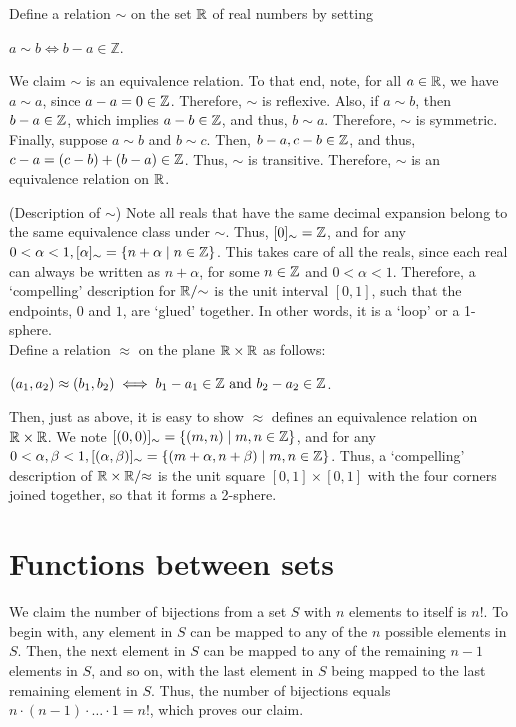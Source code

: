 \begin{xca}
Define a relation $\sim$ on the set $\mathbb{R}$ of real numbers by setting
\begin{center}
 $a \sim b \iff b - a \in \mathbb{Z}$.
\end{center}
We claim $\sim$ is an equivalence relation. To that end, note, for all $a \in
\mathbb{R}$, we have $a \sim a$, since $a - a = 0 \in \mathbb{Z}$. Therefore, $\sim$ is
reflexive. Also, if $a \sim b$, then $b - a \in \mathbb{Z}$, which implies $a - b \in
\mathbb{Z}$, and thus, $b \sim a$. Therefore, $\sim$ is symmetric. Finally, suppose $a
\sim b$ and $b \sim c$. Then, $b - a, c - b \in \mathbb{Z}$, and thus, $c - a = (c - b)
+ (b - a) \in \mathbb{Z}$. Thus, $\sim$ is transitive. Therefore, $\sim$ is an
equivalence relation on $\mathbb{R}$.

(Description of $\sim$) Note all reals that have the same decimal expansion
belong to the same equivalence class under $\sim$. Thus, $[0]_{\sim} = \mathbb{Z}$, and
for any $0 < \alpha < 1, [\alpha]_{\sim} = \{ n + \alpha \mid n \in \mathbb{Z} \}$. This
takes care of all the reals, since each real can always be written as $n +
\alpha$, for some $n \in \mathbb{Z}$ and $0 < \alpha < 1$. Therefore, a `compelling'
description for $\mathbb{R}/{\sim}$ is the unit interval $[0,1]$, such that the
endpoints, $0$ and $1$, are `glued' together. In other words, it is a `loop'
or a 1-sphere.\\

Define a relation $\approx$ on the plane $\mathbb{R} \times \mathbb{R}$ as follows:
\begin{center}
$(a_1, a_2) \approx (b_1, b_2) \iff b_1 - a_1 \in \mathbb{Z} \text{ and }
b_2 - a_2 \in \mathbb{Z}$.
\end{center}
Then, just as above, it is easy to show $\approx$ defines an equivalence
relation on $\mathbb{R} \times \mathbb{R}$. We note $[(0,0)]_{\sim} = \{ (m,n) \mid m,n \in \mathbb{Z}
\}$, and for any $0 < \alpha, \beta < 1, [(\alpha, \beta)]_{\sim} = \{ (m +
\alpha, n + \beta) \mid m,n \in \mathbb{Z} \}$. Thus, a `compelling' description of $\mathbb{R}
\times \mathbb{R}/{\approx}$ is the unit square $[0,1] \times [0,1]$ with the four
corners joined together, so that it forms a 2-sphere.
\end{xca}

\section{Functions between sets}
\begin{xca}
We claim the number of bijections from a set $S$ with $n$ elements to itself is
$n!$. To begin with, any element in $S$ can be mapped to any of the $n$ possible
elements in $S$. Then, the next element in $S$ can be mapped to any of the
remaining $n-1$ elements in $S$, and so on, with the last element in $S$ being
mapped to the last remaining element in $S$. Thus, the number of bijections
equals $n \cdot (n-1) \cdot \ldots \cdot 1 = n!$, which proves our claim.
\end{xca}

